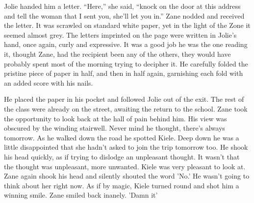 Jolie handed him a letter.  ``Here,'' she said, ``knock on the door at this address and tell the woman that I sent you, she'll let you in.''  Zane nodded and received the letter.  It was scrawled on standard white paper, yet in the light of the Zone it seemed almost grey.  The letters imprinted on the page were written in Jolie's hand, once again, curly and expressive.  It was a good job he was the one reading it, thought Zane, had the recipient been any of the others, they  would have probably spent most of the morning trying to decipher it.  He carefully folded the pristine piece of paper in half, and then in half again, garnishing each fold with an added score with his nails.

He placed the paper in his pocket and followed Jolie out of the exit.  The rest of the class were already on the street, awaiting the return to the school.  Zane took the opportunity to look back at the hall of pain behind him.  His view was obscured by the winding stairwell.  Never mind he thought, there's always tomorrow.  As he walked down the road he spotted Kiele.  Deep down he was a little disappointed that  she hadn't asked to join the trip tomorrow too.  He shook his head quickly, as if trying to dislodge an unpleasant thought.  It wasn't that the thought was unpleasant, more unwanted.  Kiele was very pleasant to look at.  Zane again shook his head and silently shouted the word 'No.'  He wasn't going to think about her right now.  As if by magic, Kiele turned round and shot him a winning smile.  Zane smiled back inanely.  'Damn it'



